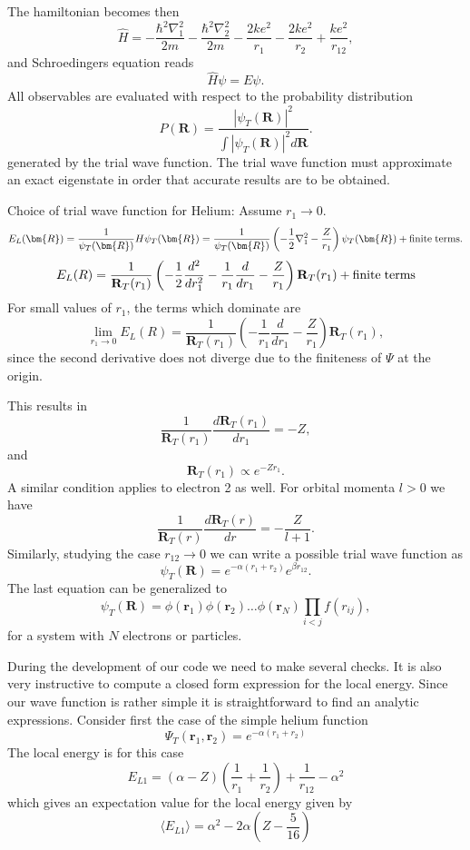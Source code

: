 The hamiltonian becomes then
\[
   \hat{H}=-\frac{\hbar^2\nabla_1^2}{2m}-\frac{\hbar^2\nabla_2^2}{2m}
          -\frac{2ke^2}{r_1}-\frac{2ke^2}{r_2}+
               \frac{ke^2}{r_{12}},
\]
and  Schroedingers equation reads
\[
   \hat{H}\psi=E\psi.
\]
All observables are evaluated with respect to the probability distribution
\[
   P(\bm{R})= \frac{\left|\psi_T(\bm{R})\right|^2}{\int \left|\psi_T(\bm{R})\right|^2d\bm{R}}.
\]
generated by the trial wave function.   
The trial wave function must approximate an exact 
eigenstate in order that accurate results are to be obtained. 

Choice of trial wave function for Helium:
Assume $r_1 \rightarrow 0$.
\[
   E_L(\bm{R})=\frac{1}{\psi_T(\bm{R})}H\psi_T(\bm{R})=
     \frac{1}{\psi_T(\bm{R})}\left(-\frac{1}{2}\nabla^2_1
     -\frac{Z}{r_1}\right)\psi_T(\bm{R}) + \mathrm{finite \hspace{0.1cm}terms}.
\]
\[ 
    E_L(R)=
    \frac{1}{\mathbf{R}_T(r_1)}\left(-\frac{1}{2}\frac{d^2}{dr_1^2}-
     \frac{1}{r_1}\frac{d}{dr_1}
     -\frac{Z}{r_1}\right)\mathbf{R}_T(r_1) + \mathrm{finite\hspace{0.1cm} terms}
\]
For small values of $r_1$, the terms which dominate are
\[ 
    \lim_{r_1 \rightarrow 0}E_L(R)=
    \frac{1}{\mathbf{R}_T(r_1)}\left(-
     \frac{1}{r_1}\frac{d}{dr_1}
     -\frac{Z}{r_1}\right)\mathbf{R}_T(r_1),
\]
since the second derivative does not diverge due to the finiteness of  $\Psi$ at the origin.

This results in
\[
     \frac{1}{\mathbf{R}_T(r_1)}\frac{d \mathbf{R}_T(r_1)}{dr_1}=-Z,
\]
and
\[
   \mathbf{R}_T(r_1)\propto e^{-Zr_1}.
\]
A similar condition applies to electron 2 as well. 
For orbital momenta $l > 0$ we have 
\[
     \frac{1}{\mathbf{R}_T(r)}\frac{d \mathbf{R}_T(r)}{dr}=-\frac{Z}{l+1}.
\]
Similarly, studying the case $r_{12}\rightarrow 0$ we can write 
a possible trial wave function as
\[
   \psi_T(\bm{R})=e^{-\alpha(r_1+r_2)}e^{\beta r_{12}}.
    \label{eq:wavehelium2}
\]
The last equation can be generalized to
\[
   \psi_T(\bm{R})=\phi(\bm{r}_1)\phi(\bm{r}_2)\dots\phi(\bm{r}_N)
                   \prod_{i < j}f(r_{ij}),
\]
for a system with $N$ electrons or particles. 

During the development of our code we need to make several checks. It is also very instructive to compute a closed form expression for the local energy. Since our wave function is rather simple  it is straightforward
to find an analytic expressions.  Consider first the case of the simple helium function 
\[
   \Psi_T(\bm{r}_1,\bm{r}_2) = e^{-\alpha(r_1+r_2)}
\]
The local energy is for this case 
\[ 
E_{L1} = \left(\alpha-Z\right)\left(\frac{1}{r_1}+\frac{1}{r_2}\right)+\frac{1}{r_{12}}-\alpha^2
\]
which gives an expectation value for the local energy given by
\[
\langle E_{L1} \rangle = \alpha^2-2\alpha\left(Z-\frac{5}{16}\right)
\]

